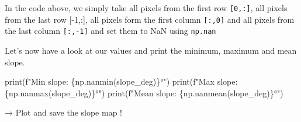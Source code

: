 \documentclass[
  letterpaper,
  DIV=11,
  numbers=noendperiod]{scrartcl}
\newenvironment{Shaded}{\begin{snugshade}}{\end{snugshade}}
\newcommand{\BuiltInTok}[1]{\textcolor[rgb]{0.00,0.23,0.31}{#1}}
\newcommand{\NormalTok}[1]{\textcolor[rgb]{0.00,0.23,0.31}{#1}}
\newcommand{\SpecialCharTok}[1]{\textcolor[rgb]{0.37,0.37,0.37}{#1}}
\newcommand{\SpecialStringTok}[1]{\textcolor[rgb]{0.13,0.47,0.30}{#1}}
\begin{document}
In the code above, we simply take all pixels from the first row
\texttt{{[}0,:{]}}, all pixels from the last row {[}-1,:{]}, all pixels
form the first column \texttt{{[}:,0{]}} and all pixels from the last
column \texttt{{[}:,-1{]}} and set them to NaN using \texttt{np.nan}

Let's now have a look at our values and print the minimum, maximum and
mean slope.

\begin{Shaded}
\begin{Highlighting}[]
\BuiltInTok{print}\NormalTok{(}\SpecialStringTok{f"Min slope:  }\SpecialCharTok{\{}\NormalTok{np}\SpecialCharTok{.}\NormalTok{nanmin(slope\_deg)}\SpecialCharTok{\}}\SpecialStringTok{°"}\NormalTok{)}
\BuiltInTok{print}\NormalTok{(}\SpecialStringTok{f"Max slope:  }\SpecialCharTok{\{}\NormalTok{np}\SpecialCharTok{.}\NormalTok{nanmax(slope\_deg)}\SpecialCharTok{\}}\SpecialStringTok{°"}\NormalTok{)}
\BuiltInTok{print}\NormalTok{(}\SpecialStringTok{f"Mean slope: }\SpecialCharTok{\{}\NormalTok{np}\SpecialCharTok{.}\NormalTok{nanmean(slope\_deg)}\SpecialCharTok{\}}\SpecialStringTok{°"}\NormalTok{)}
\end{Highlighting}
\end{Shaded}

→ Plot and save the slope map !
\end{document}

